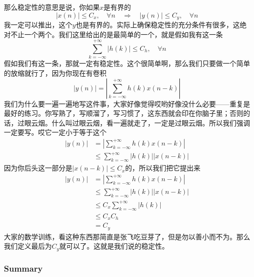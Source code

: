 \documentclass[a4paper,12pt]{article}
\begin{document}
那么稳定性的意思是说，你如果$x$是有界的
\begin{equation}
   \left | x(n) \right | \le C_x,\quad \forall n \quad\Longrightarrow \quad\left | y(n) \right | \le C_y,\quad \forall n
\end{equation}
我一定可以推出，这个$y$也是有界的。实际上确保稳定性的充分条件有很多，这绝对不止一个两个。我们这里给出的是最简单的一个，就是假如我有这一条
\begin{equation}
   \sum_{k=-\infty}^{+\infty}\left | h(k) \right | \le C_h,\quad \forall n 
\end{equation}
假如我们有这一条，那就一定有稳定性。这个很简单啊，那么我们只要做一个简单的放缩就行了，因为你现在有卷积
\begin{equation}
   \left | y(n) \right | = \left | \sum_{k=-\infty}^{+\infty}h(k)x(n-k) \right |
\end{equation}
我们为什么要一遍一遍地写这件事，大家好像觉得哎哟好像没什么必要——重复是最好的练习。你写熟了，写顺溜了，写习惯了，这东西就会印在你脑子里；否则的话，过眼云烟。什么叫过眼云烟，看一遍就走了，一定是过眼云烟。所以我们强调一定要写。哎它一定小于等于这个
\begin{equation}
\begin{aligned}
   \left | y(n) \right | &= \left | \sum_{k=-\infty}^{+\infty}h(k)x(n-k) \right |\\
&\le \sum_{k=-\infty}^{+\infty}\left |h(k)\right |\left |x(n-k) \right |
\end{aligned}
\end{equation}
因为你后头这一部分是$\left |x(n-k) \right |\le C_x$的，所以我们把它提出来
\begin{equation}
\begin{aligned}
   \left | y(n) \right | &= \left | \sum_{k=-\infty}^{+\infty}h(k)x(n-k) \right |\\
&\le \sum_{k=-\infty}^{+\infty}\left |h(k)\right |\left |x(n-k) \right |\\
&\le C_x\sum_{k=-\infty}^{+\infty}\left |h(k)\right |\\
&\le C_xC_h\\
&=C_y
\end{aligned}
\end{equation}
大家的数学训练，看这种东西那简直是张飞吃豆芽了，但是勿以善小而不为。那么我们定义最后为$C_y$就可以了。这就是我们说的稳定性。

\subsubsection{Summary}\quad
\end{document}
